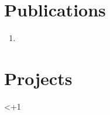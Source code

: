 \documentclass[11pt]{article}
\newcounter{li}
\begin{document}

%
%
%
%



\section{Publications}

\begin{enumerate}

  \setcounter{li}{1}

  \loop
    \ifnum\value{li}<\numexpr\numpub+1\relax

      \item \pubEntry{\theli}


  \repeat

\end{enumerate}



%
%
%
%
%



\section{Projects}

\setcounter{li}{1}

\loop
  \ifnum\value{li}<\numexpr\numproj+1\relax

    \projEntry{\theli}


\repeat
\end{document}
